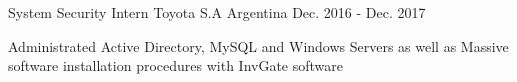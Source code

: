 \begin{cventries}
\cventry
{System Security Intern} %
{Toyota S.A} %
{Argentina} %
{Dec. 2016 - Dec. 2017} %
{
\begin{cvitems} %
\item {Administrated Active Directory, MySQL and Windows Servers as well as Massive software installation procedures with InvGate software}
\end{cvitems}
}
\end{cventries}
